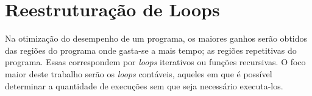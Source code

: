 
\chapter{Reestruturação de Loops}

Na otimização do desempenho de um programa, os maiores ganhos serão obtidos das 
regiões do programa onde gasta-se a mais tempo; as regiões repetitivas do
programa.
Essas correspondem por \textit{loops} iterativos ou funções recursivas.
O foco maior deste trabalho serão os \textit{loops} contáveis, aqueles em que é
possível determinar a quantidade de execuções sem que seja necessário
executa-los.


